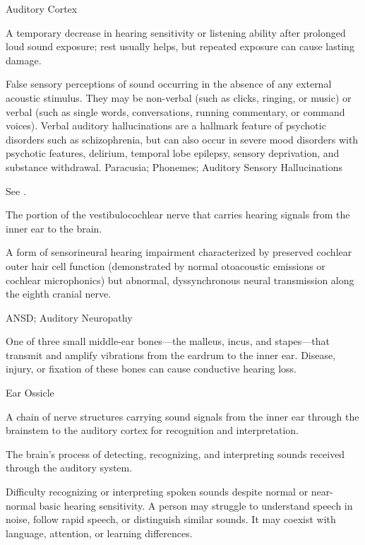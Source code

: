 \synonyms
Auditory Cortex

 A temporary decrease in hearing sensitivity or listening ability after prolonged loud sound exposure; rest usually helps, but repeated exposure can cause lasting damage.

 False sensory perceptions of sound occurring in the absence of any external acoustic stimulus. They may be non-verbal (such as clicks, ringing, or music) or verbal (such as single words, conversations, running commentary, or command voices). Verbal auditory hallucinations are a hallmark feature of psychotic disorders such as schizophrenia, but can also occur in severe mood disorders with psychotic features, delirium, temporal lobe epilepsy, sensory deprivation, and substance withdrawal.
\synonyms
Paracusia; Phonemes; Auditory Sensory Hallucinations

 See .

 The portion of the vestibulocochlear nerve that carries hearing signals from the inner ear to the brain.

 A form of sensorineural hearing impairment characterized by preserved cochlear outer hair cell function (demonstrated by normal otoacoustic emissions or cochlear microphonics) but abnormal, dyssynchronous neural transmission along the eighth cranial nerve.

\synonyms
ANSD; Auditory Neuropathy

 One of three small middle-ear bones—the malleus, incus, and stapes—that transmit and amplify vibrations from the eardrum to the inner ear. Disease, injury, or fixation of these bones can cause conductive hearing loss.

\synonyms
Ear Ossicle

 A chain of nerve structures carrying sound signals from the inner ear through the brainstem to the auditory cortex for recognition and interpretation.

 The brain's process of detecting, recognizing, and interpreting sounds received through the auditory system.

 Difficulty recognizing or interpreting spoken
sounds despite normal or near-normal basic hearing sensitivity. A person may struggle to
understand speech in noise, follow rapid speech, or distinguish similar sounds. It may
coexist with language, attention, or learning differences.

